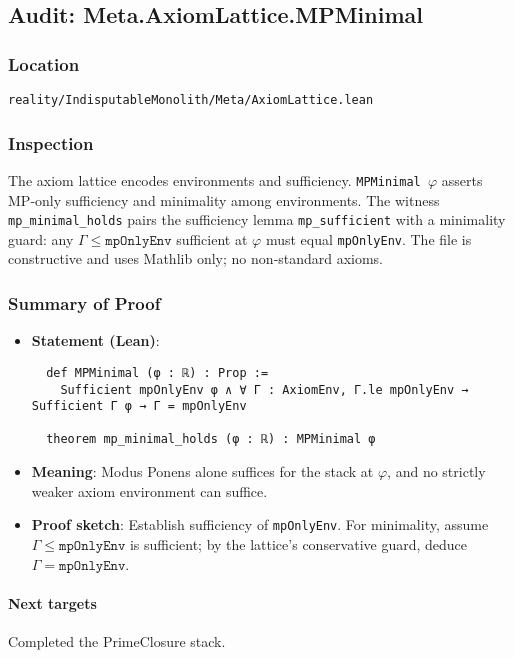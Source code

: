 \documentclass{article}
\newcommand{\FileRef}[1]{\texttt{#1}}
\begin{document}
\subsection{Audit: Meta.AxiomLattice.MPMinimal}
\subsubsection{Location}
\FileRef{reality/IndisputableMonolith/Meta/AxiomLattice.lean}

\subsubsection{Inspection}
The axiom lattice encodes environments and sufficiency. \texttt{MPMinimal \(\varphi\)} asserts MP‑only sufficiency and minimality among environments. The witness \texttt{mp\_minimal\_holds} pairs the sufficiency lemma \texttt{mp\_sufficient} with a minimality guard: any \(\Gamma\le \texttt{mpOnlyEnv}\) sufficient at \(\varphi\) must equal \texttt{mpOnlyEnv}. The file is constructive and uses Mathlib only; no non‑standard axioms.

\subsubsection{Summary of Proof}
\begin{itemize}[leftmargin=*]
  \item \textbf{Statement (Lean)}:
  \begin{lstlisting}
  def MPMinimal (φ : ℝ) : Prop :=
    Sufficient mpOnlyEnv φ ∧ ∀ Γ : AxiomEnv, Γ.le mpOnlyEnv → Sufficient Γ φ → Γ = mpOnlyEnv

  theorem mp_minimal_holds (φ : ℝ) : MPMinimal φ
  \end{lstlisting}
  \item \textbf{Meaning}: Modus Ponens alone suffices for the stack at \(\varphi\), and no strictly weaker axiom environment can suffice.
  \item \textbf{Proof sketch}: Establish sufficiency of \texttt{mpOnlyEnv}. For minimality, assume \(\Gamma\le\texttt{mpOnlyEnv}\) is sufficient; by the lattice's conservative guard, deduce \(\Gamma=\texttt{mpOnlyEnv}\).
\end{itemize}

\paragraph{Next targets} Completed the PrimeClosure stack.
\end{document}
